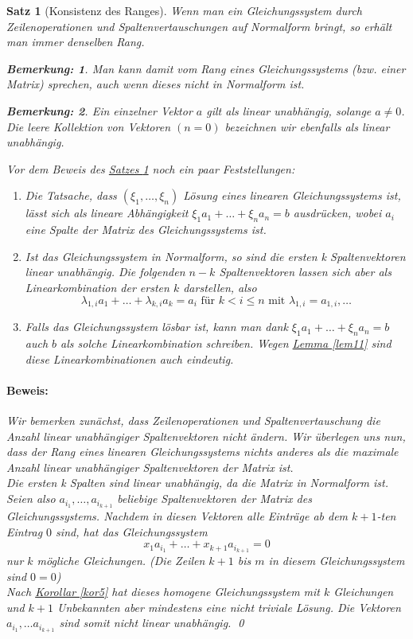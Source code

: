 \documentclass{report}
\newcommand{\lb}{\lambda}
\theoremstyle{customrem}
\newtheorem*{bemerkung}{Bemerkung\textnormal:}
\theoremstyle{customdef}
\newtheorem{satz}[definition]{Satz}
\renewenvironment{proof}{\paragraph{Beweis: }}{\qed}
\begin{document}
	\begin{satz}[Konsistenz des Ranges]
		\label{satz12}
		Wenn man ein Gleichungssystem durch Zeilenoperationen und Spaltenvertauschungen auf Normalform bringt, so erhält man immer denselben Rang.		
		\begin{bemerkung}
			Man kann damit vom Rang eines Gleichungssystems (bzw. einer Matrix) sprechen, auch wenn dieses nicht in Normalform ist.
		\end{bemerkung}
		\begin{bemerkung}
			Ein einzelner Vektor $a$ gilt als linear unabhängig, solange $a \neq 0$. Die leere Kollektion von Vektoren $(n=0)$ bezeichnen wir ebenfalls als linear unabhängig.
		\end{bemerkung}
		 Vor dem Beweis des \hyperref[satz12]{Satzes \ref*{satz12}} noch ein paar Feststellungen:
		\begin{enumerate}
			\item Die Tatsache, dass $(\xi_1, \dots, \xi_n)$ Lösung eines linearen Gleichungssystems ist, lässt sich als lineare Abhängigkeit 
			$\xi_1a_1 + \dots + \xi_n a_n = b$ ausdrücken, wobei $a_i$ eine Spalte der Matrix des Gleichungssystems ist.
			\item Ist das Gleichungssystem in Normalform, so sind die ersten k Spaltenvektoren linear unabhängig. Die folgenden $n-k$ Spaltenvektoren lassen sich aber als Linearkombination der ersten $k$ darstellen, also
			$$
			\lb_{1,i}a_1 + \dots + \lb_{k,i}a_k = a_i \text{ für } k < i \le n
			\text{ mit }  \lb_{1,i} = a_{1,i}, \dots
			$$
			\item Falls das Gleichungssystem lösbar ist, kann man dank $\xi_1a_1 + \dots + \xi_n a_n = b$ auch $b$ als solche Linearkombination schreiben. Wegen \hyperref[lem11]{Lemma \ref*{lem11}} sind diese Linearkombinationen auch eindeutig.
		\end{enumerate}
		\begin{proof}
			Wir bemerken zunächst, dass Zeilenoperationen und Spaltenvertauschung die Anzahl linear unabhängiger Spaltenvektoren nicht ändern.
			Wir überlegen uns nun, dass der Rang eines linearen Gleichungssystems nichts anderes als die maximale Anzahl linear unabhängiger Spaltenvektoren der Matrix ist.\\
			Die ersten k Spalten sind linear unabhängig, da die Matrix in Normalform ist. Seien also $a_{i_1}, \dots, a_{i_{k+1}}$ beliebige Spaltenvektoren der Matrix des Gleichungssystems. Nachdem in diesen Vektoren alle Einträge ab dem $k+1$-ten Eintrag $0$ sind, hat das Gleichungssystem \\
			$$
			x_1a_{i_1} + \dots + x_{k+1}a_{i_{k+1}} = 0
			$$
			nur $k$ mögliche Gleichungen. (Die Zeilen $k+1$ bis $m$ in diesem Gleichungssystem sind $0=0$)\\
			Nach \hyperref[kor5]{Korollar \ref*{kor5}} hat dieses homogene Gleichungssystem mit $k$ Gleichungen und $k+1$ Unbekannten aber mindestens eine nicht triviale Lösung. Die Vektoren $a_{i_1}, \dots a_{i_{k+1}}$ sind somit nicht linear unabhängig.
		\end{proof}
	\end{satz}
\end{document}

